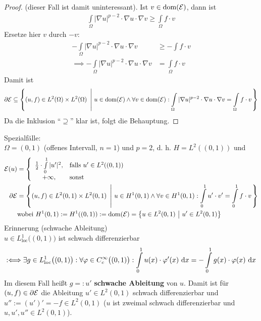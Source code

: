 \begin{beispiel}
\begin{proof}
(dieser Fall ist damit uninteressant). Ist $v\in\text{dom}(\mathcal{E})$, dann ist 
\begin{align*}
\int\limits_\Omega |\nabla u|^{p-2}\cdot\nabla u\cdot\nabla v\geq\int\limits_\Omega f\cdot v
\end{align*}
Ersetze hier $v$ durch $-v$:
\begin{align*}
-\int\limits_\Omega|\nabla u|^{p-2}\cdot\nabla u\cdot\nabla v&\geq-\int\limits f\cdot v\\
\implies
-\int\limits_\Omega |\nabla u|^{p-2}\cdot\nabla u\cdot\nabla v&=\int\limits_\Omega f\cdot v
\end{align*}
Damit ist 
\begin{align*}
\partial\mathcal{E}\subseteq\left\lbrace(u,f)\in L^2(\Omega)\times L^2(\Omega)~\left|~u\in\text{dom}(\mathcal{E})\wedge\forall v\in\text{dom}(\mathcal{E}):\int\limits_\Omega|\nabla u|^{p-2}\cdot\nabla u\cdot\nabla v=\int\limits_\Omega f\cdot v\right.\right\rbrace
\end{align*}
Da die Inklusion ``$\supseteq$'' klar ist, folgt die Behauptung.
\end{proof}
Spezialfälle:\\
$\Omega=(0,1)$ (offenes Intervall, $n=1$) und $p=2$, d. h. $H=L^2((0,1))$ und 
\begin{align*}
\mathcal{E}(u)&=\left\lbrace\begin{array}{cl}
\frac{1}{2}\cdot\int\limits_0^1|u'|^2,&\text{falls } u'\in L^2((0,1))\\
+\infty, &\text{sonst }
\end{array}\right.\\
\partial\mathcal{E}&=\left\lbrace(u,f)\in L^2(0,1)\times L^2(0,1)~\left|~ u\in H^1(0,1)\wedge\forall v\in H^1(0,1):\int\limits_0^1 u'\cdot v'=\int\limits_0^1 f\cdot v\right.\right\rbrace\\
&\text{wobei } H^1(0,1):=H^1((0,1)):=\text{dom}(\mathcal{E})=\big\lbrace u\in L^2(0,1)~\big|~u'\in L^2(0,1)\big\rbrace
\end{align*}
Erinnerung (schwache Ableitung)\\
$u\in L^1_{\text{loc}}\big((0,1)\big)$ ist schwach differenzierbar
\begin{align*}
:\Longleftrightarrow\exists g\in L^1_{\text{loc}}\big((0,1)\big):\forall\varphi\in C_c^\infty\big((0,1)\big):
\int\limits_0^1 u(x)\cdot\varphi'(x)\text{ d} x=-\int\limits_0^1 g(x)\cdot\varphi(x)\text{ d} x
\end{align*}
Im diesem Fall heißt $g=:u'$ \textbf{schwache Ableitung} von $u$. Damit ist für $(u,f)\in\partial\mathcal{E}$ die Ableitung $u'\in L^2(0,1)$ schwach differenzierbar und $u'':=(u')'=-f\in L^2(0,1)$ ($u$ ist zweimal schwach differenzierbar und $u,u',u''\in L^2(0,1)$).

\end{beispiel}
